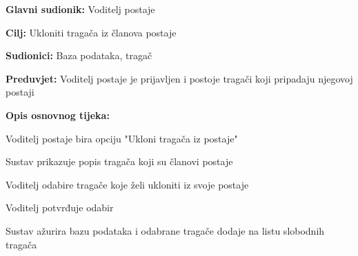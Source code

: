 					\noindent {}
					\begin{packed_item}
						
						\item \textbf{Glavni sudionik:} Voditelj postaje
						\item \textbf{Cilj:} Ukloniti tragača iz članova postaje
						\item \textbf{Sudionici:} Baza podataka, tragač
						\item \textbf{Preduvjet:} Voditelj postaje je prijavljen i postoje tragači koji pripadaju njegovoj postaji
						\item \textbf{Opis osnovnog tijeka:}
						
						\item[] \begin{packed_enum}
							
							\item Voditelj postaje bira opciju "Ukloni tragača iz postaje" 
							\item Sustav prikazuje popis tragača koji su članovi postaje
							\item Voditelj odabire tragače koje želi ukloniti iz svoje postaje 
							\item Voditelj potvrđuje odabir 
							\item Sustav ažurira bazu podataka i odabrane tragače dodaje na listu slobodnih tragača
						\end{packed_enum}
					\end{packed_item}
					
